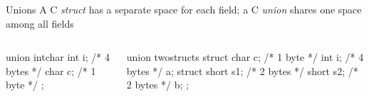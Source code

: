 \documentclass{plt}
\begin{document}
\begin{frame}[fragile]{Unions}
\footnotesize
A C \emph{struct} has a separate space for each field; a C
\emph{union} shares one space among all fields

\begin{columns}
  \begin{column}[t]{0.45\textwidth}
\begin{C}
union intchar {
  int i;   /* 4 bytes */
  char c;  /* 1 byte  */
};
\end{C}

  \end{column}
  \begin{column}[t]{0.5\textwidth}
\begin{C}
union twostructs {
  struct {
    char c;   /* 1 byte */
    int i;    /* 4 bytes */
  } a;
  struct {
    short s1; /* 2 bytes */
    short s2; /* 2 bytes */
  } b;
};
\end{C}

  \end{column}
\end{columns}

\end{frame}
\end{document}
